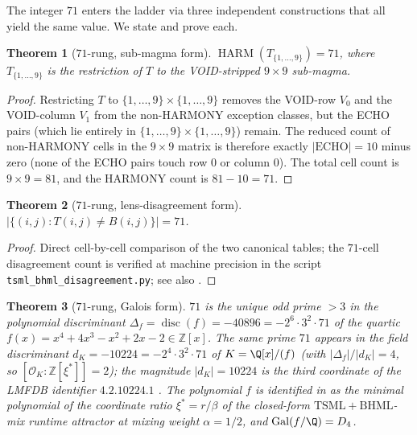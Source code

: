\documentclass[11pt,reqno]{amsart}
\newtheorem{theorem}{Theorem}[section]
\theoremstyle{definition}
\newcommand{\Z}{\mathbb{Z}}
\newcommand{\TSML}{\mathrm{TSML}}
\newcommand{\BHML}{\mathrm{BHML}}
\DeclareMathOperator{\HARM}{HARM}
\DeclareMathOperator{\disc}{disc}
\begin{document}
The integer $71$ enters the ladder via three independent constructions
that all yield the same value. We state and prove each.

\begin{theorem}[$71$-rung, sub-magma form]
\label{thm:71-submagma}
$\HARM(T_{\{1,\ldots,9\}}) = 71$, where
$T_{\{1,\ldots,9\}}$ is the restriction of $T$ to the
VOID-stripped $9 \times 9$ sub-magma.
\end{theorem}

\begin{proof}
Restricting $T$ to $\{1, \ldots, 9\} \times \{1, \ldots, 9\}$
removes the VOID-row $V_0$ and the VOID-column $V_1$ from the
non-HARMONY exception classes, but the ECHO pairs (which lie
entirely in $\{1, \ldots, 9\} \times \{1, \ldots, 9\}$) remain.
The reduced count of non-HARMONY cells in the $9 \times 9$ matrix
is therefore exactly $|\mathrm{ECHO}| = 10$ minus zero (none of
the ECHO pairs touch row $0$ or column $0$). The total cell count
is $9 \times 9 = 81$, and the HARMONY count is
$81 - 10 = 71$.
\end{proof}

\begin{theorem}[$71$-rung, lens-disagreement form]
\label{thm:71-disagree}
$|\{(i, j) : T(i, j) \neq B(i, j)\}| = 71$.
\end{theorem}

\begin{proof}
Direct cell-by-cell comparison of the two canonical tables; the
$71$-cell disagreement count is verified at machine precision in
the script \texttt{tsml\_bhml\_disagreement.py}; see also
\cite{Sanders2026LensInvariance}.
\end{proof}

\begin{theorem}[$71$-rung, Galois form]
\label{thm:71-galois}
\label{subsec:71-galois}
$71$ is the unique odd prime $> 3$ in the polynomial discriminant
$\Delta_f = \disc(f) = -40896 = -2^{6} \cdot 3^{2} \cdot 71$ of the
quartic $f(x) = x^4 + 4 x^3 - x^2 + 2 x - 2 \in \Z[x]$. The same
prime $71$ appears in the field discriminant $d_K = -10224 = -2^4
\cdot 3^2 \cdot 71$ of $K = \Q[x]/(f)$ (with $|\Delta_f|/|d_K| = 4$,
so $[\mathcal{O}_K : \Z[\xi^*]] = 2$); the magnitude $|d_K| = 10224$
is the third coordinate of the LMFDB identifier $4.2.10224.1$
\cite{Sanders2026Attractor}. The polynomial $f$ is identified in
\cite{Sanders2026Attractor} as the minimal polynomial of the
coordinate ratio $\xi^* = r/\beta$ of the closed-form $\TSML+\BHML$-mix
runtime attractor at mixing weight $\alpha = 1/2$, and
$\mathrm{Gal}(f/\Q) = D_4$.
\end{theorem}
\end{document}
